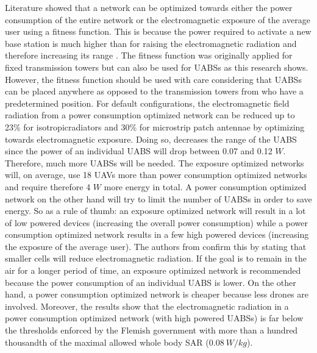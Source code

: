 Literature showed that a network can be optimized towards either the power consumption of the entire network 
or the electromagnetic exposure of the average user using a fitness function. This is because the power required to activate a new 
base station is much higher than for raising the electromagnetic radiation and therefore increasing its range \cite{J1}.
The fitness function was originally applied for fixed transmission towers but can also be used 
for \gls{UABS}s as this research shows.
However, the fitness function should be used with care considering that \gls{UABS}s can be placed anywhere as opposed to 
the transmission towers from \cite{J1} who have a predetermined position.  
For default configurations, the electromagnetic field radiation from a
power consumption optimized network can be reduced up to 23\% for \gls{isotropicradiator}s and 30\% for microstrip patch antennae 
by optimizing towards electromagnetic exposure. Doing so, decreases the range of the \gls{UABS}  since the power of an individual \gls{UABS} will 
drop between 0.07 and 0.12 $W$. Therefore, much more \gls{UABS}s will be needed. 
The exposure optimized networks will, on average, use 18 \gls{UAV}s more than power consumption optimized networks
and require therefore 4 $W$ more energy in total.
A power consumption optimized network on the other hand will try to limit the number of \gls{UABS}s 
in order to save energy.
 So as a rule of thumb: an exposure optimized network will result in a lot of low powered devices (increasing the overall power consumption)
while a power consumption optimized network results in a few high powered devices (increasing the exposure of the average user).
The authors from \cite{J17_kuehn2019modelling} confirm this by stating that smaller cells will reduce electromagnetic radiation. 
If the goal is to remain in the air for a longer period of time, an exposure optimized network is recommended because the power consumption of 
an individual \gls{UABS} is lower.
On the other hand, a power consumption optimized network is cheaper because less drones are involved.
Moreover, the results show that the electromagnetic radiation in a power consumption optimized network (with high powered \gls{UABS}s)
is far below the thresholds enforced by the Flemish government with more than a hundred thousandth of the maximal allowed whole body \gls{SAR} ($0.08\ W/kg$).


